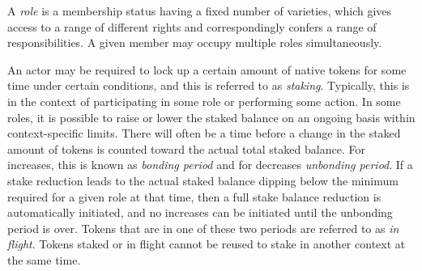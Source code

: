 \documentclass{article}
\begin{document}
A \textit{role} is a membership status having a fixed number of varieties, which gives access to a range of different rights and correspondingly confers a range of responsibilities. A given member may occupy multiple roles simultaneously.

\begin{comment}
\renewcommand{\arraystretch}{2.1} %
\begin{table}[!t]
\begin{center}
\resizebox{0.8\textwidth}{!}{\begin{minipage}{\textwidth}
\begin{tabular}{lp{5cm}p{2cm}cp{3cm}}

 \toprule

 \bf Name &
 \bf Description &
 \bf Reward &
 \bf Staked &
 \bf Entry \\

 \midrule

 Validator &
 Participates in the consensus algorithm as a block producer and validator. Read more in section X. &
 0 &
 Yes &
 004\\

 Member &
 Participates in the consensus algorithm as a block producer and validator. Read more in section X. &
 0 &
 Yes &
 004\\

 Voter &
 Participates in the consensus algorithm as a block producer and validator. Read more in section X. &
 0 &
 Yes &
 004\\

 Counicil Member &
 Participates in the consensus algorithm as a block producer and validator. Read more in section X. &
 0 &
 Yes &
 004\\

\bottomrule
\end{tabular}
\caption{Table of all roles on the platform.}
\label{tbl:role_list}
\end{minipage} }
\end{center}
\end{table}
\end{comment}

An actor may be required to lock up a certain amount of native tokens for some time under certain conditions, and this is referred to as
\textit{staking}. Typically, this is in the context of participating in some role or performing some action. In some roles, it is possible to raise or lower the staked balance on an ongoing basis within context-specific limits. There will often be a time before a change in the staked amount of tokens is counted toward the actual total staked balance. For increases, this is known as \textit{bonding period} and for decreases \textit{unbonding period}. If a stake reduction leads to the actual staked balance dipping below the minimum required for a given role at that time, then a full stake balance reduction is automatically initiated, and no increases can be initiated until the unbonding period is over. Tokens that are in one of these two periods are referred to as \textit{in flight}. Tokens staked or in flight cannot be reused to stake in another context at the same time.
\end{document}
